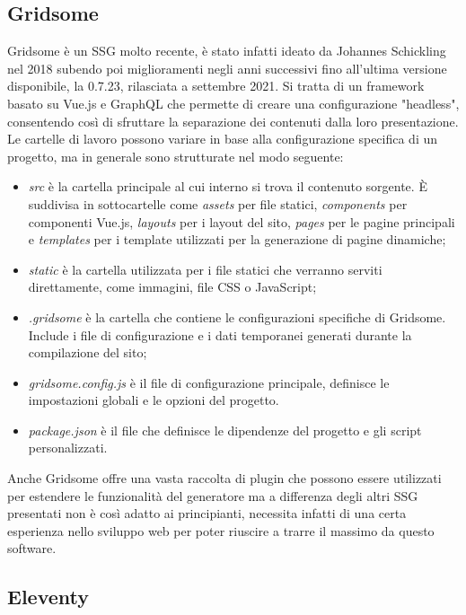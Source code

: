 \documentclass[target=bach,aauheader=]{thud}
\begin{document}
\subsection{Gridsome}
Gridsome è un SSG molto recente, è stato infatti ideato da Johannes Schickling nel 2018 subendo poi miglioramenti negli anni successivi fino all'ultima versione disponibile, la 0.7.23, rilasciata a settembre 2021.
Si tratta di un framework basato su Vue.js e GraphQL che permette di creare una configurazione "headless", consentendo così di sfruttare la separazione dei contenuti dalla loro presentazione.
Le cartelle di lavoro possono variare in base alla configurazione specifica di un progetto, ma in generale sono strutturate nel modo seguente:

\begin{itemize}
    \item \textit{src} è la cartella principale al cui interno si trova il contenuto sorgente. È suddivisa in sottocartelle come \textit{assets} per file statici, \textit{components} per componenti Vue.js, \textit{layouts} per i layout del sito, \textit{pages} per le pagine principali e \textit{templates} per i template utilizzati per la generazione di pagine dinamiche;
    \item \textit{static} è la cartella utilizzata per i file statici che verranno serviti direttamente, come immagini, file CSS o JavaScript;
    \item \textit{.gridsome} è la cartella che contiene le configurazioni specifiche di Gridsome. Include i file di configurazione e i dati temporanei generati durante la compilazione del sito;
    \item \textit{gridsome.config.js} è il file di configurazione principale, definisce le impostazioni globali e le opzioni del progetto.
    \item \textit{package.json} è il file che definisce le dipendenze del progetto e gli script personalizzati.
\end{itemize}
Anche Gridsome offre una vasta raccolta di plugin che possono essere utilizzati per estendere le funzionalità del generatore ma a differenza degli altri SSG presentati non è così adatto ai principianti, necessita infatti di una certa esperienza nello sviluppo web per poter riuscire a trarre il massimo da questo software.

\subsection{Eleventy}
\end{document}
